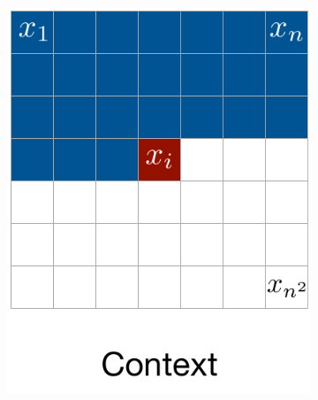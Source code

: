 \begin{figure}[h]

\hfill
\begin{subfigure}{.14\textwidth}
	\includegraphics[width=\textwidth]{context5.pdf}
\end{subfigure}
\hfill
\begin{subfigure}{.14\textwidth}

\end{subfigure}
\end{figure}
